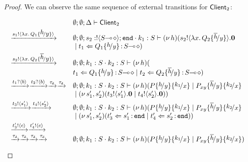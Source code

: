 \begin{proof}
\noi	We can observe the same sequence of external transitions for $\mathsf{Client}_2$:

\[
	\begin{array}{ll}
		& \es; \es; \Delta \proves \Client_2
\\[1mm]

		\by{\bactout{s_1}{\abs{x}{Q_1 \subst{h}{y}}}}&
		\es; \es; s_2: \btout{\lhot{S}} \tinact \cat k_1: S \proves \newsp{h}{\bout{s_2}{\abs{x}{Q_2 \subst{\dual{h}}{y}}} \inact\\
		& \Par \ftrigger{t_1}{Q_1 \subst{h}{y}}{\lhot{S}}}
\\[1mm]

		\by{\bactout{s_2}{\abs{x}{Q_2 \subst{\dual{h}}{y}}}}&
		\es; \es; k_1: S \cat k_2: S \proves \newsp{h}{\\
		& \ftrigger{t_1}{Q_1 \subst{h}{y}}{\lhot{S}} \Par \ftrigger{t_2}{Q_2 \subst{\dual{h}}{y}}{\lhot{S}}}
\\[1mm]

		\by{\bactinp{t_1}{b}} \by{\bactinp{t_2}{b}} \by{\dtau}\by{\dtau}&
		\es; \es; k_1: S \cat k_2: S \proves \newsp{h}{
		P\subst{h}{y} \subst{k_1}{x} \Par P_{xy}\subst{\dual{h}}{y} \subst{k_2}{x}\\
		& \Par \newsp{s_1', s_2'}{\bout{t_3}{s_1'} \inact \Par \bout{t_4}{s_2'} \inact}}
\\[1mm]

		\by{\bactout{t_3}{s_1'}} \by{ \bactout{t_4}{s_2'}} &
		\es; \es; k_1: S \cat k_2: S \proves \newsp{h}{
		P\subst{h}{y} \subst{k_1}{x} \Par P_{xy}\subst{\dual{h}}{y} \subst{k_2}{x}\\
		& \Par \newsp{s_1', s_2'}{\ftrigger{t_3'}{s_1'}{\tinact} \Par \ftrigger{t_4'}{s_2'}{\tinact}}}
\\[1mm]

		\by{\bactout{t_3'}{c}} \by{ \bactout{t_4'}{c}} \\
		\by{\dtau} \by{\dtau} \by{\dtau} \by{\dtau} &
		\es; \es; k_1: S \cat k_2: S \proves \newsp{h}{
		P\subst{h}{y} \subst{k_1}{x} \Par P_{xy}\subst{\dual{h}}{y} \subst{k_2}{x}}
		\\[1mm]



\end{array}\]
\end{proof}
